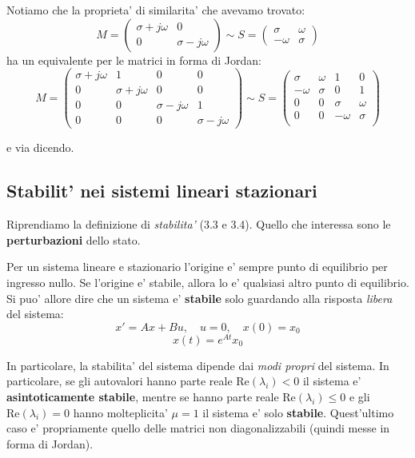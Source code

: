 \documentclass[a4paper,11pt]{article}
\begin{document}
\par\smallskip
Notiamo che la proprieta' di similarita' che avevamo trovato:
$$
M = \begin{pmatrix}
	\sigma + j\omega & 0 \\
	0 & \sigma - j\omega
\end{pmatrix}
\sim
S = \begin{pmatrix}
	\sigma & \omega \\
	-\omega & \sigma
\end{pmatrix}
$$
ha un equivalente per le matrici in forma di Jordan:
$$
M=
\begin{pmatrix}
	\sigma + j \omega & 1 & 0 & 0 \\
	0 & \sigma + j \omega & 0 & 0 \\
	0 & 0 & \sigma - j \omega & 1 \\
	0 & 0 & 0 & \sigma - j \omega
\end{pmatrix}
\sim 
S=
\begin{pmatrix}
	\sigma & \omega & 1 & 0 \\
	-\omega & \sigma & 0 & 1 \\
	0 & 0 & \sigma & \omega \\
	0 & 0 & -\omega & \sigma \\
\end{pmatrix}
$$

e via dicendo.

\subsection{Stabilit' nei sistemi lineari stazionari}
Riprendiamo la definizione di \textit{stabilita'} (3.3 e 3.4).
Quello che interessa sono le \textbf{perturbazioni} dello stato.

Per un sistema lineare e stazionario l'origine e' sempre punto di equilibrio per ingresso nullo.
Se l'origine e' stabile, allora lo e' qualsiasi altro punto di equilibrio.
Si puo' allore dire che un sistema e' \textbf{stabile} solo guardando alla risposta \textit{libera} del sistema:
$$
x' = Ax + Bu, \quad u = 0, \quad x(0) = x_0
$$
$$
x(t) = e^{At}x_0
$$

In particolare, la stabilita' del sistema dipende dai \textit{modi propri} del sistema.
In particolare, se gli autovalori hanno parte reale $\mathrm{Re}(\lambda_i) < 0$ il sistema e' \textbf{asintoticamente stabile}, mentre se hanno parte reale $\mathrm{Re}(\lambda_i) \leq 0$ e gli $\mathrm{Re}(\lambda_i) = 0$ hanno molteplicita' $\mu =1$ il sistema e' solo \textbf{stabile}.
Quest'ultimo caso e' propriamente quello delle matrici non diagonalizzabili (quindi messe in forma di Jordan).
\end{document}
